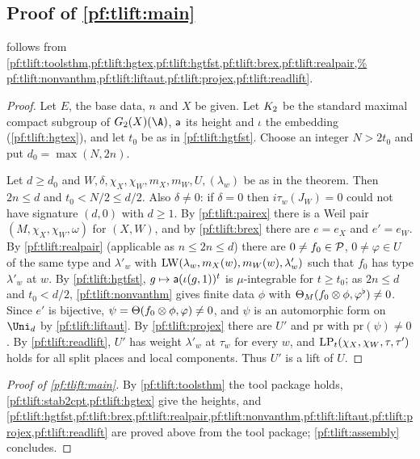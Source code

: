\subsection{Proof of \texorpdfstring{\cref{pf:tlift:main}}{the theorem}}\label{pf:tlift:proof}

\begin{proposition}[Assembly]\label{pf:tlift:assembly}
 follows from \cref{pf:tlift:toolsthm,pf:tlift:hgtex,pf:tlift:hgtfst,pf:tlift:brex,pf:tlift:realpair,%
pf:tlift:nonvanthm,pf:tlift:liftaut,pf:tlift:projex,pf:tlift:readlift}.
\end{proposition}

\begin{proof}
Let $E$, the base data, $n$ and $X$ be given. Let $K_2$ be the standard maximal compact subgroup of $G_2(X)(\A)$,
$\mathsf{a}$ its height and $\iota$ the embedding (\cref{pf:tlift:hgtex}), and let $t_0$ be as in \cref{pf:tlift:hgtfst}. Choose
an integer $N>2t_0$ and put $d_0=\max(N,2n)$.

Let $d\ge d_0$ and $W,\delta,\chi_X,\chi_W,m_X,m_W,U,(\lambda_w)$ be as in the theorem. Then $2n\le d$ and $t_0<N/2\le d/2$. Also $\delta\ne0$:
if $\delta=0$ then $i\tau_w(J_W)=0$ could not have signature $(d,0)$ with $d\ge1$. By \cref{pf:tlift:pairex} there is a
Weil pair $(M,\chi_X,\chi_W,\omega)$ for $(X,W)$, and by \cref{pf:tlift:brex} there are $e=e_X$ and $e'=e_W$. By
\cref{pf:tlift:realpair} (applicable as $n\le2n\le d$) there are $0\ne f_0\in\mathcal{P}$, $0\ne\varphi\in U$ of the same type
and $\lambda'_w$ with $\mathrm{LW}(\lambda_w,m_X(w),m_W(w),\lambda'_w)$ such that $f_0$ has type $\lambda'_w$ at $w$. By
\cref{pf:tlift:hgtfst}, $g\mapsto\mathsf{a}(\iota(g,1))^t$ is $\mu$-integrable for $t\ge t_0$; as $2n\le d$ and $t_0<d/2$,
\cref{pf:tlift:nonvanthm} gives finite data $\phi$ with $\Theta_M(f_0\otimes\phi,\varphi^\flat)\ne0$. Since $e'$ is bijective,
$\psi=\Theta(f_0\otimes\phi,\varphi)\ne0$, and $\psi$ is an automorphic form on $\Uni_d$ by \cref{pf:tlift:liftaut}. By
\cref{pf:tlift:projex} there are $U'$ and $\mathrm{pr}$ with $\mathrm{pr}(\psi)\ne0$. By \cref{pf:tlift:readlift}, $U'$ has weight $\lambda'_w$ at
$\tau_w$ for every $w$, and $\mathrm{LP}_t(\chi_X,\chi_W,\tau,\tau')$ holds for all split places and local components. Thus $U'$ is a
lift of $U$.
\end{proof}

\begin{proof}[Proof of \cref{pf:tlift:main}]
By \cref{pf:tlift:toolsthm} the tool package holds, \cref{pf:tlift:stab2cpt,pf:tlift:hgtex} give the heights, and
\cref{pf:tlift:hgtfst,pf:tlift:brex,pf:tlift:realpair,pf:tlift:nonvanthm,pf:tlift:liftaut,pf:tlift:projex,pf:tlift:readlift}
are proved above from the tool package; \cref{pf:tlift:assembly} concludes.
\end{proof}

